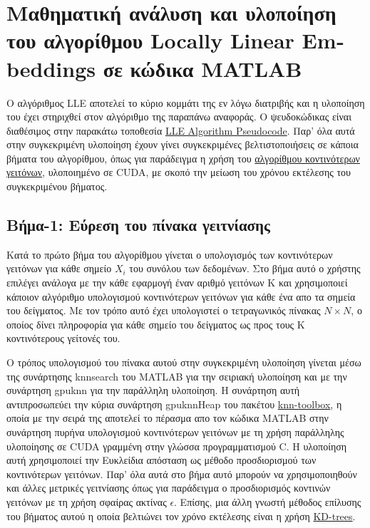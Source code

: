\section{Μαθηματική ανάλυση και υλοποίηση του αλγορίθμου \textlatin{Locally Linear Embeddings} σε κώδικα \textlatin{MATLAB}}
\par
Ο αλγόριθμος \textlatin{LLE}\cite{lle} αποτελεί το κύριο κομμάτι της εν λόγω διατριβής και η υλοποίηση του έχει στηριχθεί στον αλγόριθμο της παραπάνω αναφοράς. Ο ψευδοκώδικας είναι διαθέσιμος στην παρακάτω τοποθεσία \href{https://www.cs.nyu.edu/~roweis/lle/algorithm.html}{\textlatin{LLE Algorithm Pseudocode}}. Παρ' όλα αυτά στην συγκεκριμένη υλοποίηση έχουν γίνει συγκεκριμένες βελτιστοποιήσεις σε κάποια βήματα του αλγορίθμου, όπως για παράδειγμα η χρήση του \href{http://autogpu.ee.auth.gr/doku.php?id=cuknns:gpu_accelerated_k-nearest_neighbor_library}{αλγορίθμου κοντινότερων γειτόνων}, υλοποιημένο σε \textlatin{CUDA}, με σκοπό την μείωση του χρόνου εκτέλεσης του συγκεκριμένου βήματος. 

\subsection{Βήμα-1: Εύρεση του πίνακα γειτνίασης}
\par
Κατά το πρώτο βήμα του αλγορίθμου γίνεται ο υπολογισμός των κοντινότερων γειτόνων για κάθε σημείο $X_{i}$ του συνόλου των δεδομένων. Στο βήμα αυτό ο χρήστης επιλέγει ανάλογα με την κάθε εφαρμογή έναν αριθμό γειτόνων \textlatin{K} και χρησιμοποιεί κάποιον αλγόριθμο υπολογισμού κοντινότερων γειτόνων για κάθε ένα απο τα σημεία του δείγματος. Με τον τρόπο αυτό έχει υπολογιστεί ο τετραγωνικός πίνακας $N \times N$, ο οποίος δίνει πληροφορία για κάθε σημείο του δείγματος ως προς τους \textlatin{K} κοντινότερους γείτονές του.
\par
Ο τρόπος υπολογισμού του πίνακα αυτού στην συγκεκριμένη υλοποίηση γίνεται μέσω της συνάρτησης \textlatin{knnsearch} του \textlatin{MATLAB} για την σειριακή υλοποίηση και με την συνάρτηση \textlatin{gpu\textunderscore knn} για την παράλληλη υλοποίηση. Η συνάρτηση αυτή αντιπροσωπεύει την κύρια συνάρτηση \textlatin{gpuknnHeap} του πακέτου \href{http://autogpu.ee.auth.gr/doku.php?id=cuknns:gpu_accelerated_k-nearest_neighbor_library}{\textlatin{knn-toolbox}}, η οποία με την σειρά της αποτελεί το πέρασμα απο τον κώδικα \textlatin{MATLAB} στην συνάρτηση πυρήνα υπολογισμού κοντινότερων γειτόνων με τη χρήση παράλληλης υλοποίησης σε \textlatin{CUDA} γραμμένη στην γλώσσα προγραμματισμού \textlatin{C}. Η υλοποίηση αυτή χρησιμοποιεί την Ευκλείδια απόσταση ως μέθοδο προσδιορισμού των κοντινότερων γειτόνων. Παρ' όλα αυτά στο βήμα αυτό μπορούν να χρησιμοποιηθούν και άλλες μετρικές γειτνίασης όπως για παράδειγμα ο προσδιορισμός κοντινών γειτόνων με τη χρήση σφαίρας ακτίνας $\epsilon$. Επίσης, μια άλλη γνωστή μέθοδος επίλυσης του βήματος αυτού η οποία βελτιώνει τον χρόνο εκτέλεσης είναι η χρήση \href{https://en.wikipedia.org/wiki/K-d_tree}{\textlatin{KD-trees}}.

